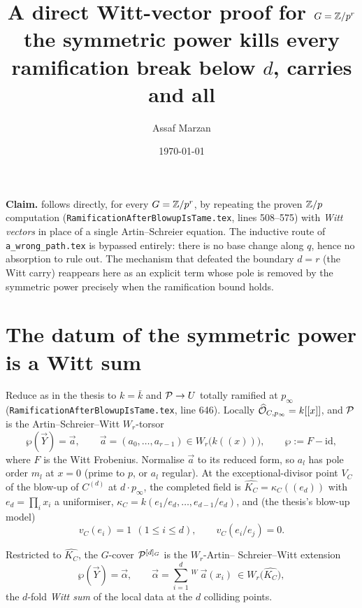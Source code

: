 \documentclass[11pt]{article}
\title{A direct Witt-vector proof for $G=\mathbb{Z}/p^r$\\[2pt]
       {\large the symmetric power kills every ramification break below $d$,
        carries and all}}
\author{Assaf Marzan}
\date{\today}
\begin{document}
\maketitle

\noindent\textbf{Claim.}
 follows directly,
for every $G=\mathbb{Z}/p^r$, by repeating the proven $\mathbb{Z}/p$ computation
(\texttt{RamificationAfterBlowupIsTame.tex}, lines 508--575) with \emph{Witt
vectors} in place of a single Artin--Schreier equation. The inductive route of
\texttt{a\_wrong\_path.tex} is bypassed entirely: there is no base change along
$q$, hence no absorption to rule out. The mechanism that defeated the boundary
$d=r$ (the Witt carry) reappears here as an explicit term whose pole is removed
by the symmetric power precisely when the ramification bound holds.

\section{The datum of the symmetric power is a Witt sum}\label{sec:datum}

Reduce as in the thesis to $k=\bar k$ and $\mathcal{P}\to U$ totally ramified at
$p_\infty$ (\texttt{RamificationAfterBlowupIsTame.tex}, line 646). Locally
$\widehat{\mathcal{O}}_{C,p_\infty}=k[[x]]$, and $\mathcal{P}$ is the Artin--Schreier--Witt
$W_r$-torsor
\[
\wp(\vec Y)=\vec a,\qquad \vec a=(a_0,\dots,a_{r-1})\in W_r\big(k((x))\big),\qquad
\wp:=F-\mathrm{id},
\]
where $F$ is the Witt Frobenius. Normalise $\vec a$ to its reduced form, so
$a_l$ has pole order $m_l$ at $x=0$ (prime to $p$, or $a_l$ regular). At the
exceptional-divisor point $V_C$ of the blow-up of $C^{(d)}$ at $d\cdot p_\infty$,
the completed field is $\widehat{K_C}=\kappa_C((e_d))$ with $e_d=\prod_i x_i$ a
uniformiser, $\kappa_C=k(e_1/e_d,\dots,e_{d-1}/e_d)$, and (the thesis's blow-up
model)
\begin{equation}\label{eq:valrule}
v_C(e_i)=1\ \ (1\le i\le d),\qquad v_C(e_i/e_j)=0 .
\end{equation}

\begin{lemma}\label{lem:datum}
Restricted to $\widehat{K_C}$, the $G$-cover $\mathcal{P}^{[d]_G}$ is the $W_r$-Artin--
Schreier--Witt extension
\[
\wp(\vec Y)=\vec\alpha,\qquad
\vec\alpha=\sum_{i=1}^{d}{}^{\,W}\ \vec a(x_i)\ \in W_r\big(\widehat{K_C}\big),
\]
the $d$-fold \emph{Witt sum} of the local data at the $d$ colliding points.
\end{lemma}
\end{document}
